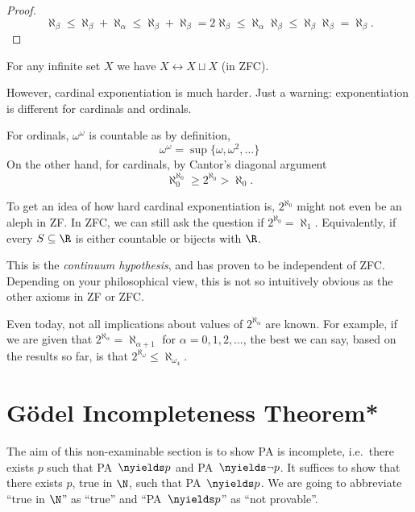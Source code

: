 \documentclass[a4paper]{article}
\newcommand*{\biject}{\leftrightarrow}
\begin{document}
\begin{proof}
  \[
    \aleph_\beta \leq \aleph_\beta + \aleph_\alpha \leq \aleph_\beta + \aleph_\beta = 2\aleph_\beta \leq \aleph_\alpha \aleph_\beta \leq \aleph_\beta \aleph_\beta = \aleph_\beta.
  \]
\end{proof}

\begin{eg}
  For any infinite set \(X\) we have \(X \biject X \sqcup X\) (in ZFC).
\end{eg}

However, cardinal exponentiation is much harder. Just a warning: exponentiation is different for cardinals and ordinals.

\begin{eg}
  For ordinals, \(\omega^\omega\) is countable as by definition,
  \[
    \omega^\omega = \sup\{\omega, \omega^2, \dots \}
  \]
  On the other hand, for cardinals, by Cantor's diagonal argument
  \[
    \aleph_0^{\aleph_0} \geq 2^{\aleph_0} > \aleph_0.
  \]
\end{eg}

To get an idea of how hard cardinal exponentiation is, \(2^{\aleph_0}\) might not even be an aleph in ZF. In ZFC, we can still ask the question if \(2^{\aleph_0} = \aleph_1\). Equivalently, if every \(S \subseteq \R\) is either countable or bijects with \(\R\).

This is the \emph{continuum hypothesis}, and has proven to be independent of ZFC. Depending on your philosophical view, this is not so intuitively obvious as the other axioms in ZF or ZFC.

Even today, not all implications about values of \(2^{\aleph_\alpha}\) are known. For example, if we are given that \(2^{\aleph_\alpha} = \aleph_{\alpha + 1}\) for \(\alpha = 0, 1, 2, \dots\), the best we can say, based on the results so far, is that \(2^{\aleph_\omega} \leq \aleph_{\omega_4}\).

\section{Gödel Incompleteness Theorem*}

The aim of this non-examinable section is to show PA is incomplete, i.e.\ there exists \(p\) such that PA~\(\nyields p\) and PA~\(\nyields \neg p\). It suffices to show that there exists \(p\), true in \(\N\), such that PA~\(\nyields p\). We are going to abbreviate ``true in \(\N\)'' as ``true'' and ``PA~\(\nyields p\)'' as ``not provable''.
\end{document}
